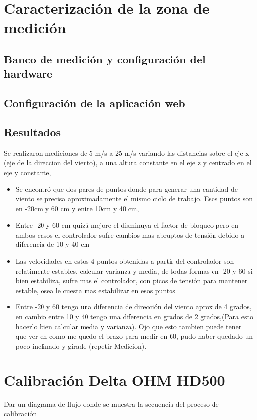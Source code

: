 \section{Caracterización de la zona de medición}
\subsection{Banco de medición y configuración del hardware}
\subsection{Configuración de la aplicación web}
\subsection{Resultados}


Se realizaron mediciones de 5 m/s a 25 m/s variando las distancias sobre el eje x (eje de la direccion del viento), a una altura constante en el eje z y centrado en el eje y constante, 

\begin{itemize}
    \item Se encontró que dos pares de puntos donde para generar una cantidad de viento se precisa aproximadamente el mismo ciclo de trabajo. Esos puntos son en -20cm y 60 cm y entre 10cm y 40 cm, 
    \item Entre -20 y 60 cm quizá mejore el disminuya el factor de bloqueo pero en ambos casos el controlador sufre cambios mas abruptos de tensión debido a diferencia de 10 y 40 cm
    \item Las velocidades en estos 4 puntos obtenidas a partir del controlador son relatimente estables, calcular varianza y media, de todas formas en -20 y 60 si bien estabiliza, sufre mas el controlador, con picos de tensión para mantener estable, osea le cuesta mas estabilizar en esos puntos
    \item Entre -20 y 60 tengo una diferencia de dirección del  viento aprox de  4 grados, en cambio entre 10 y 40 tengo una diferencia en grados de 2 grados,(Para esto hacerlo bien calcular media y varianza). Ojo que esto tambien puede tener que ver en como me quedo el brazo para medir en 60, pudo haber quedado un poco inclinado y girado (repetir Medicion).
\end{itemize}

\section{Calibración Delta OHM HD500}
Dar un diagrama de flujo donde se muestra la secuencia del proceso de calibración


